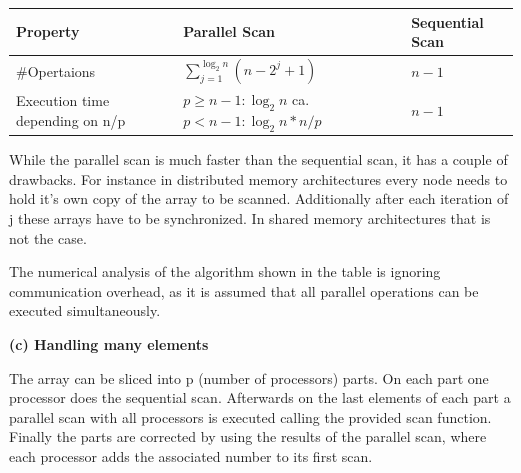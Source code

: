 \documentclass[a4paper,twoside,11pt]{article}
\begin{document}
\begin{tabular}{|p{3cm}|p{6cm}|l|}
\hline
Property&Parallel Scan& Sequential Scan\\
\hline
\hline
\#Opertaions& $\sum\limits_{j=1}^{\log_2n}(n-2^j+1)$& $n-1$\\
\hline

Execution time depending on n/p & $p \ge n -1 : \log_2n$ \newline ca.  $p < n -1 : \log_2n * n/p$& $n-1$\\
\hline

\end{tabular}

While the parallel scan is much faster than the sequential scan, it has  a couple of drawbacks. For instance in distributed memory architectures every node needs to hold it's own copy of the array to be scanned. Additionally after each iteration of j these arrays have to be synchronized. In shared memory architectures that is not the case.

The numerical analysis of the algorithm shown in the table is ignoring communication overhead, as it is assumed that all parallel operations can be executed simultaneously.


\newpage
\textbf{(c) Handling many elements}

The array can be sliced into p (number of processors) parts. On each part one processor does the sequential scan. Afterwards on the last elements of each part a parallel scan with all processors is executed calling the provided scan function. Finally the parts are corrected by using the results of the parallel scan, where each processor adds the associated number to its first scan.
\end{document}
